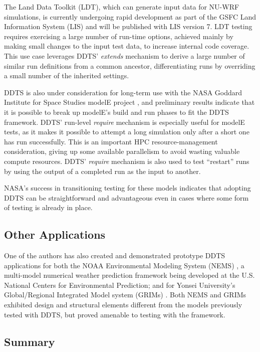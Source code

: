 \documentclass[conference]{IEEEtran}
\begin{document}
The Land Data Toolkit (LDT), which can generate input data for NU-WRF simulations, is currently undergoing rapid development as part of the GSFC Land Information System (LIS) \cite{lis} and will be published with LIS version 7. LDT testing requires exercising a large number of run-time options, achieved mainly by making small changes to the input test data, to increase internal code coverage. This use case leverages DDTS' \emph{extends} mechanism to derive a large number of similar run definitions from a common ancestor, differentiating runs by overriding a small number of the inherited settings.

DDTS is also under consideration for long-term use with the NASA Goddard Institute for Space Studies modelE project \cite{modele}, and preliminary results indicate that it is possible to break up modelE's build and run phases to fit the DDTS framework. DDTS' run-level \emph{require} mechanism is especially useful for modelE tests, as it makes it possible to attempt a long simulation only after a short one has run successfully. This is an important HPC resource-management consideration, giving up some available parallelism to avoid wasting valuable compute resources. DDTS' \emph{require} mechanism is also used to test ``restart'' runs by using the output of a completed run as the input to another.

NASA's success in transitioning testing for these models indicates that adopting DDTS can be straightforward and advantageous even in cases where some form of testing is already in place.

\subsection{Other Applications}

One of the authors has also created and demonstrated prototype DDTS applications for both the NOAA Environmental Modeling System (NEMS) \cite{nems}, a multi-model numerical weather prediction framework being developed at the U.S. National Centers for Environmental Prediction; and for Yonsei University's Global/Regional Integrated Model system (GRIMs) \cite{grims}. Both NEMS and GRIMs exhibited design and structural elements different from the models previously tested with DDTS, but proved amenable to testing with the framework.

\subsection{Summary}
\end{document}
